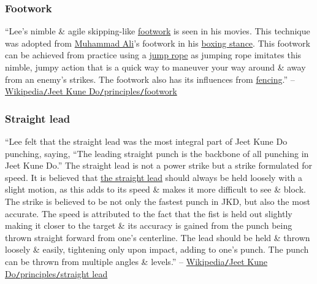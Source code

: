 \documentclass[oneside]{book}
\numberwithin{equation}{section}
\begin{document}
\subsubsection{Footwork}
``Lee's nimble \& agile skipping-like \href{https://en.wikipedia.org/wiki/Footwork_(martial_arts)}{footwork} is seen in his movies. This technique was adopted from \href{https://en.wikipedia.org/wiki/Muhammad_Ali}{Muhammad Ali}'s footwork in his \href{https://en.wikipedia.org/wiki/Boxing_career_of_Muhammad_Ali}{boxing stance}. This footwork can be achieved from practice using a \href{https://en.wikipedia.org/wiki/Skipping_rope}{jump rope} as jumping rope imitates this nimble, jumpy action that is a quick way to maneuver your way around \& away from an enemy's strikes. The footwork also has its influences from \href{https://en.wikipedia.org/wiki/Fencing}{fencing}.'' -- \href{https://en.wikipedia.org/wiki/Jeet_Kune_Do#Footwork}{Wikipedia\texttt{/}Jeet Kune Do\texttt{/}principles\texttt{/}footwork}

\subsubsection{Straight lead}
``Lee felt that the straight lead was the most integral part of Jeet Kune Do punching, saying, ``The leading straight punch is the backbone of all punching in Jeet Kune Do.'' The straight lead is not a power strike but a strike formulated for speed. It is believed that \href{https://web.archive.org/web/20170513180657/http://jkdjeetkunedo.blogspot.co.uk/2009/11/jkd-leading-straight-punch.html}{the straight lead} should always be held loosely with a slight motion, as this adds to its speed \& makes it more difficult to see \& block. The strike is believed to be not only the fastest punch in JKD, but also the most accurate. The speed is attributed to the fact that the fist is held out slightly making it closer to the target \& its accuracy is gained from the punch being thrown straight forward from one's centerline. The lead should be held \& thrown loosely \& easily, tightening only upon impact, adding to one's punch. The punch can be thrown from multiple angles \& levels.'' -- \href{https://en.wikipedia.org/wiki/Jeet_Kune_Do#Straight_lead}{Wikipedia\texttt{/}Jeet Kune Do\texttt{/}principles\texttt{/}straight lead}
\end{document}
